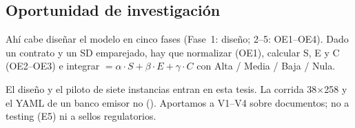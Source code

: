 \subsection{Oportunidad de investigación}

Ahí cabe diseñar el modelo en cinco fases (Fase~1: diseño; 2--5: OE1--OE4). Dado un contrato y un
SD emparejado, hay que normalizar (OE1), calcular S, E y C (OE2--OE3) e integrar
\AlignmentScore{} $= \alpha \cdot S + \beta \cdot E + \gamma \cdot C$ con Alta / Media / Baja /
Nula.

El diseño y el piloto de siete instancias entran en esta tesis. La corrida 38$\times$258 y el
YAML de un banco emisor no (). Aportamos a V1--V4 sobre documentos; no a
testing (E5) ni a sellos regulatorios.
